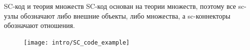\begin{frame}[shrink=5]{SC-код и теория множеств}
  SC-код основан на теории множеств, поэтому все sc-узлы обозначают
  либо внешние объекты, либо множества, а sc-коннекторы обозначают
  отношения.
  \begin{figure}
    \centering
    \texttt{[image: intro/SC\_code\_example]}
  \end{figure}
\end{frame}


